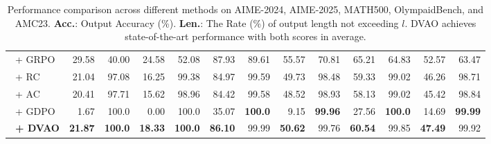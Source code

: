 \documentclass{llmxive}
\begin{document}
\begin{table}[t!]
{\begin{tabular}{l rr rr rr rr rr rr}
    ~+ GRPO & 29.58 & 40.00 & 24.58 & 52.08 & 87.93 & 89.61 & 55.57 & 70.81 & 65.21 & 64.83 & 52.57 & 63.47 \\
    \addlinespace[0.1em]
    \hline
    \addlinespace[0.25em]
    ~+ RC & 21.04 & 97.08 & 16.25 & 99.38 & 84.97 & 99.59 & 49.73 & 98.48 & 59.33 & 99.02 & 46.26 & 98.71 \\
    ~+ AC & 20.41 & 97.71 & 15.62 & 98.96 & 84.42 & 99.58 & 48.52 & 98.93 & 58.13 & 99.02 & 45.42 & 98.84 \\
    ~+ GDPO & 1.67 & 100.0 & 0.00 & 100.0 & 35.07 & \textbf{100.0} & 9.15 & \textbf{99.96} & 27.56 & \textbf{100.0} & 14.69 & \textbf{99.99} \\
    \addlinespace[0.1em]
    \rowcolor{lightblue}
    ~\textbf{+ DVAO} & \textbf{21.87} & \textbf{100.0} & \textbf{18.33} & \textbf{100.0} & \textbf{86.10} & 99.99 & \textbf{50.62} & 99.76 & \textbf{60.54} & 99.85 & \textbf{47.49} & 99.92 \\
    \bottomrule
    \end{tabular}
    }
    \label{tab:main_math}
\caption{Performance comparison across different methods on AIME-2024, AIME-2025, MATH500, OlympaidBench, and AMC23. \textbf{Acc.}: Output Accuracy (\%). \textbf{Len.}: The Rate (\%) of output length not exceeding $l$. DVAO achieves state-of-the-art performance with both scores in average.}
\end{table}
\end{document}
